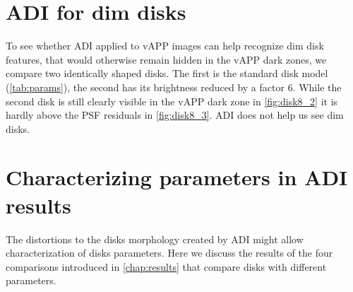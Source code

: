 \section{ADI for dim disks}
To see whether \ac{ADI} applied to \ac{vAPP} images can help recognize dim disk features, that would otherwise remain hidden in the \ac{vAPP} dark zones, we compare two identically shaped disks. The first is the standard disk model (\autoref{tab:params}), the second has its brightness reduced by a factor 6. While the second disk is still clearly visible in the \ac{vAPP} dark zone in \autoref{fig:disk8_2} it is hardly above the \ac{PSF} residuals in \autoref{fig:disk8_3}. \ac{ADI} does not help us see dim disks.

\section{Characterizing parameters in ADI results}
The distortions to the disks morphology created by \ac{ADI} might allow characterization of disks parameters. Here we discuss the results of the four comparisons introduced in \autoref{chap:results} that compare disks with different parameters.

